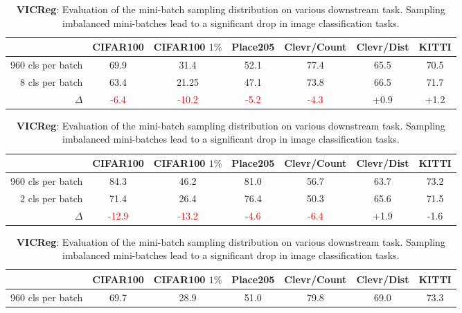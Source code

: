 \documentclass{article} %
\begin{document}
\begin{table}[h]
    \centering
    \footnotesize
    \caption{\textbf{SimCLR}: Evaluation of the mini-batch sampling distribution on various downstream task. Sampling imbalanced mini-batches lead to a significant drop in image classification tasks.}
    \label{tb:simclr}
    \begin{tabular}{r|cccc|cc}
        \toprule
        & CIFAR100 & CIFAR100 $1\%$ & Place205 & Clevr/Count & Clevr/Dist & KITTI\\
        \toprule\toprule
        960 cls per batch & 69.9 & 31.4 & 52.1 & 77.4 & 65.5 & 70.5\\
        8 cls per batch & 63.4 & 21.25 & 47.1 & 73.8 & 66.5 & 71.7\\
        $\Delta$ & \textcolor{red}{-6.4} & \textcolor{red}{-10.2} & \textcolor{red}{-5.2} & \textcolor{red}{-4.3} & +0.9 & +1.2\\
    \end{tabular}
    \vspace{1.5em}
    \centering
    \footnotesize
    \caption{\textbf{MSN}: Evaluation of the mini-batch sampling distribution on various downstream task. Sampling imbalanced mini-batches lead to a significant drop in image classification tasks.}
    \label{tb:msn}
    \begin{tabular}{r|cccc|cc}
        \toprule
        & CIFAR100 & CIFAR100 $1\%$ & Place205 & Clevr/Count & Clevr/Dist & KITTI \\
        \toprule\toprule
        960 cls per batch & 84.3 & 46.2 & 81.0 & 56.7 & 63.7 & 73.2 \\
        2 cls per batch & 71.4 & 26.4 & 76.4 & 50.3 & 65.6 & 71.5 \\
        $\Delta$ & \textcolor{red}{-12.9} & \textcolor{red}{-13.2} & \textcolor{red}{-4.6} & \textcolor{red}{-6.4} & +1.9 & -1.6 \\
    \end{tabular}
    \vspace{1.5em}
    \centering
    \footnotesize
    \caption{\textbf{VICReg}: Evaluation of the mini-batch sampling distribution on various downstream task. Sampling imbalanced mini-batches lead to a significant drop in image classification tasks.}
    \label{tb:vicreg}
    \begin{tabular}{r|cccc|cc}
        \toprule
        & CIFAR100 & CIFAR100 $1\%$ & Place205 & Clevr/Count & Clevr/Dist & KITTI \\
        \toprule\toprule
        960 cls per batch & 69.7 & 28.9 & 51.0 & 79.8 & 69.0 & 73.3\\

\end{tabular}
\end{table}
\end{document}
